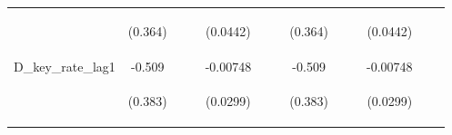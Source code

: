 \documentclass[]{article}
\begin{document}
\begin{center}
\begin{tabular}{lcccccccccccc}
\vspace{4pt} & \begin{footnotesize}(0.364)\end{footnotesize} & \begin{footnotesize}\end{footnotesize} & \begin{footnotesize}\end{footnotesize} & \begin{footnotesize}(0.0442)\end{footnotesize} & \begin{footnotesize}\end{footnotesize} & \begin{footnotesize}\end{footnotesize} & \begin{footnotesize}(0.364)\end{footnotesize} & \begin{footnotesize}\end{footnotesize} & \begin{footnotesize}\end{footnotesize} & \begin{footnotesize}(0.0442)\end{footnotesize} & \begin{footnotesize}\end{footnotesize} & \begin{footnotesize}\end{footnotesize} \\
D\_key\_rate\_lag1 & -0.509 &  &  & -0.00748 &  &  & -0.509 &  &  & -0.00748 &  &  \\
\vspace{4pt} & \begin{footnotesize}(0.383)\end{footnotesize} & \begin{footnotesize}\end{footnotesize} & \begin{footnotesize}\end{footnotesize} & \begin{footnotesize}(0.0299)\end{footnotesize} & \begin{footnotesize}\end{footnotesize} & \begin{footnotesize}\end{footnotesize} & \begin{footnotesize}(0.383)\end{footnotesize} & \begin{footnotesize}\end{footnotesize} & \begin{footnotesize}\end{footnotesize} & \begin{footnotesize}(0.0299)\end{footnotesize} & \begin{footnotesize}\end{footnotesize} & \begin{footnotesize}\end{footnotesize} \\

\end{tabular}
\end{center}
\end{document}
